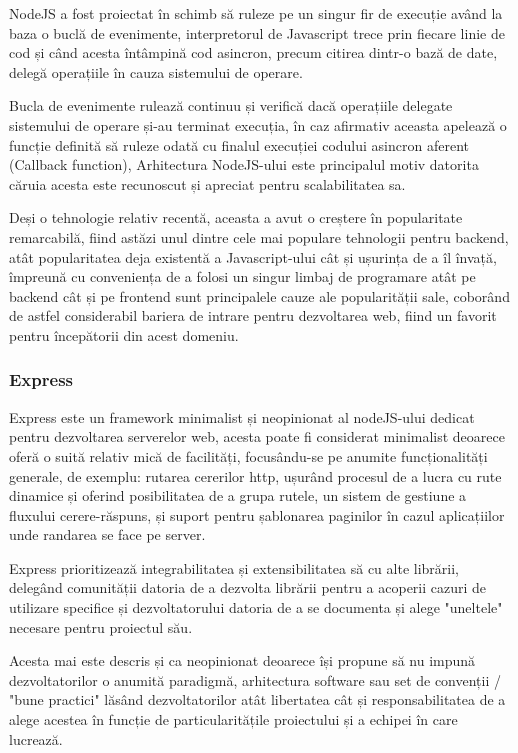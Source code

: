 \documentclass[12pt,a4paper,hidelinks]{report}
\theoremstyle{definition}
\theoremstyle{remark}
\begin{document}
NodeJS a fost proiectat în schimb să ruleze pe un singur fir de execuție
având la baza o buclă de evenimente, interpretorul de Javascript trece prin fiecare linie de cod și când acesta întâmpină cod asincron, precum citirea dintr-o bază de date, delegă operațiile în cauza sistemului de operare.

Bucla de evenimente rulează continuu și verifică dacă operațiile delegate sistemului de operare și-au terminat execuția, în caz afirmativ aceasta apelează o funcție definită să ruleze odată cu finalul execuției codului asincron aferent
(Callback function), Arhitectura NodeJS-ului este principalul motiv datorita căruia acesta este recunoscut și apreciat pentru scalabilitatea sa. 

Deși o tehnologie relativ recentă, aceasta a avut o creștere în popularitate
remarcabilă, fiind astăzi unul dintre cele mai populare tehnologii pentru backend, atât popularitatea deja existentă a Javascript-ului cât și ușurința de a îl învață, împreună cu 
conveniența de a folosi un singur limbaj de programare atât pe backend cât și pe frontend sunt principalele cauze ale popularității sale, coborând de astfel considerabil
bariera de intrare pentru dezvoltarea web, fiind un favorit pentru începătorii din acest domeniu.
\subsubsection{Express}
Express\cite{2} este un framework minimalist și neopinionat al nodeJS-ului dedicat pentru dezvoltarea serverelor web, acesta poate fi considerat minimalist deoarece oferă
o suită relativ mică de facilități, focusându-se pe anumite funcționalități generale, de exemplu: rutarea cererilor http, ușurând procesul de a lucra cu rute dinamice și oferind posibilitatea de a grupa rutele, un sistem
de gestiune a fluxului cerere-răspuns, și suport pentru șablonarea paginilor în cazul aplicațiilor unde randarea se face pe server.

Express prioritizează integrabilitatea și extensibilitatea să cu alte librării, delegând comunității datoria de a dezvolta librării pentru a acoperii cazuri de utilizare specifice și dezvoltatorului datoria de a se documenta și alege "uneltele" necesare pentru proiectul său.

Acesta mai este descris și ca neopinionat deoarece își propune să nu impună dezvoltatorilor o anumită paradigmă, arhitectura software
sau set de convenții / "bune practici" lăsând dezvoltatorilor atât libertatea cât și responsabilitatea de a alege acestea în funcție de particularitățile proiectului și a echipei în care lucrează. 
\end{document}
